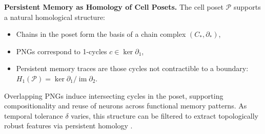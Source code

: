 \documentclass[lettersize,journal]{IEEEtran}
\begin{document}
\noindent\textbf{Persistent Memory as Homology of Cell Posets.}
The cell poset \( \mathcal{P} \) supports a natural homological structure:
\begin{itemize}
    \item Chains in the poset form the basis of a chain complex \( (C_*, \partial_*) \),
    \item PNGs correspond to 1-cycles \( c \in \ker \partial_1 \),
    \item Persistent memory traces are those cycles not contractible to a boundary: \( H_1(\mathcal{P}) = \ker \partial_1 / \operatorname{im} \partial_2 \).
\end{itemize}
Overlapping PNGs induce intersecting cycles in the poset, supporting compositionality and reuse of neurons across functional memory patterns. As temporal tolerance \( \delta \) varies, this structure can be filtered to extract topologically robust features via persistent homology \cite{edelsbrunner2008persistent}. 
\end{document}

